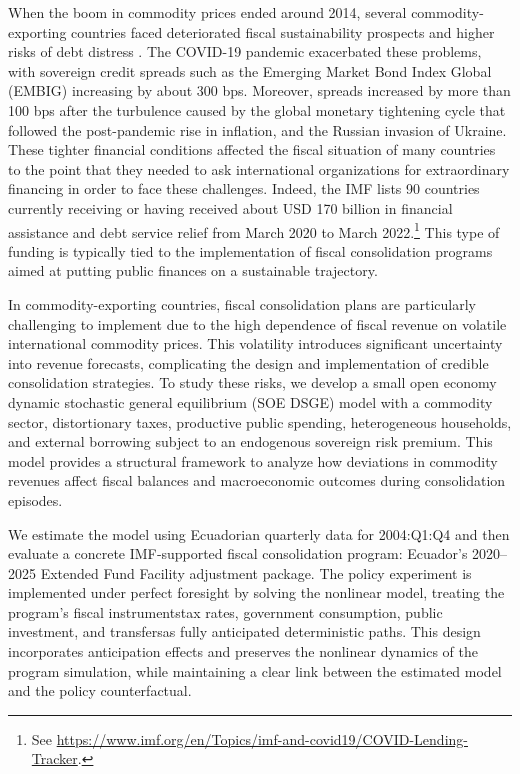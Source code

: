 \documentclass[12pt]{article}
\begin{document}
When the boom in commodity prices ended around 2014, several commodity-exporting countries faced deteriorated fiscal sustainability prospects and higher risks of debt distress \citep[see][]{richaud2019fiscal}. The COVID-19 pandemic exacerbated these problems, with sovereign credit spreads such as the Emerging Market Bond Index Global (EMBIG) increasing by about 300 bps. Moreover, spreads increased by more than 100 bps after the turbulence caused by the global monetary tightening cycle that followed the post-pandemic rise in inflation, and the Russian invasion of Ukraine. These tighter financial conditions affected the fiscal situation of many countries to the point that they needed to ask international organizations for extraordinary financing in order to face these challenges. Indeed, the IMF lists 90 countries currently receiving or having received about USD 170 billion in financial assistance and debt service relief from March 2020 to March 2022.\footnote{See \url{https://www.imf.org/en/Topics/imf-and-covid19/COVID-Lending-Tracker}.} This type of funding is typically tied to the implementation of fiscal consolidation programs aimed at putting public finances on a sustainable trajectory. 

In commodity-exporting countries, fiscal consolidation plans are particularly challenging to implement due to the high dependence of fiscal revenue on volatile international commodity prices. This volatility introduces significant uncertainty into revenue forecasts, complicating the design and implementation of credible consolidation strategies. To study these risks, we develop a small open economy dynamic stochastic general equilibrium (SOE DSGE) model with a commodity sector, distortionary taxes, productive public spending, heterogeneous households, and external borrowing subject to an endogenous sovereign risk premium. This model provides a structural framework to analyze how deviations in commodity revenues affect fiscal balances and macroeconomic outcomes during consolidation episodes.

We estimate the model using Ecuadorian quarterly data for 2004:Q1:Q4 and then evaluate a concrete IMF‑supported fiscal consolidation program: Ecuador’s 2020–2025 Extended Fund Facility adjustment package. The policy experiment is implemented under perfect foresight by solving the nonlinear model, treating the program’s fiscal instruments\textemdash tax rates, government consumption, public investment, and transfers\textemdash as fully anticipated deterministic paths. This design incorporates anticipation effects and preserves the nonlinear dynamics of the program simulation, while maintaining a clear link between the estimated model and the policy counterfactual.
\end{document}
